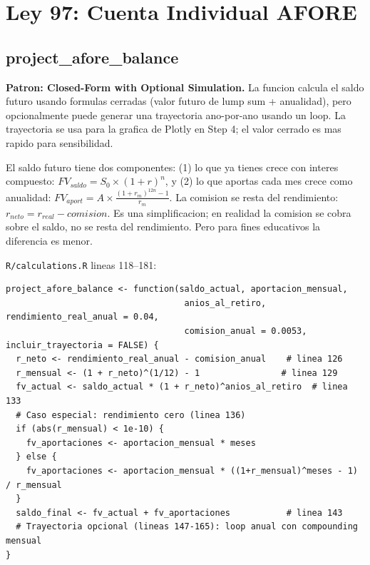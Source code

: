 \documentclass[11pt, letterpaper, twoside]{report}
\begin{document}
\section{Ley 97: Cuenta Individual AFORE}
\label{sec:ley97}

\subsection{project\_afore\_balance}

\begin{patronbox}
\textbf{Patron: Closed-Form with Optional Simulation.} La funcion calcula el saldo
futuro usando formulas cerradas (valor futuro de lump sum + anualidad), pero
opcionalmente puede generar una trayectoria ano-por-ano usando un loop. La
trayectoria se usa para la grafica de Plotly en Step 4; el valor cerrado es mas
rapido para sensibilidad.
\end{patronbox}

\begin{intuicionbox}
El saldo futuro tiene dos componentes: (1) lo que ya tienes crece con interes
compuesto: $FV_{saldo} = S_0 \times (1+r)^n$, y (2) lo que aportas cada mes crece
como anualidad: $FV_{aport} = A \times \frac{(1+r_m)^{12n} - 1}{r_m}$.
La comision se resta del rendimiento: $r_{neto} = r_{real} - comision$.
Es una simplificacion; en realidad la comision se cobra sobre el saldo, no se resta
del rendimiento. Pero para fines educativos la diferencia es menor.
\end{intuicionbox}

\begin{codigobox}
\texttt{R/calculations.R} lineas 118--181:
\begin{lstlisting}[caption={Proyeccion AFORE con formula cerrada}]
project_afore_balance <- function(saldo_actual, aportacion_mensual,
                                   anios_al_retiro, rendimiento_real_anual = 0.04,
                                   comision_anual = 0.0053, incluir_trayectoria = FALSE) {
  r_neto <- rendimiento_real_anual - comision_anual    # linea 126
  r_mensual <- (1 + r_neto)^(1/12) - 1                # linea 129
  fv_actual <- saldo_actual * (1 + r_neto)^anios_al_retiro  # linea 133
  # Caso especial: rendimiento cero (linea 136)
  if (abs(r_mensual) < 1e-10) {
    fv_aportaciones <- aportacion_mensual * meses
  } else {
    fv_aportaciones <- aportacion_mensual * ((1+r_mensual)^meses - 1) / r_mensual
  }
  saldo_final <- fv_actual + fv_aportaciones           # linea 143
  # Trayectoria opcional (lineas 147-165): loop anual con compounding mensual
}
\end{lstlisting}
\end{codigobox}
\end{document}
